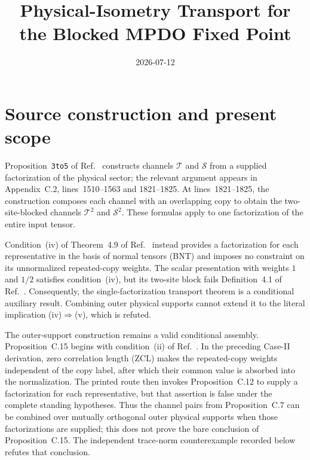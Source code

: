\documentclass{article}
\title{Physical-Isometry Transport for the Blocked MPDO Fixed Point}
\author{}
\date{2026-07-12}
\begin{document}
\maketitle
{}

\section{Source construction and present scope}

Proposition~\texttt{3to5} of Ref.~\cite{Cirac2016MPDO_arXiv} constructs
channels $\mathcal T$ and $\mathcal S$ from a supplied factorization of the
physical sector; the relevant argument appears in Appendix~C.2,
lines~1510--1563 and 1821--1825. At lines~1821--1825, the construction
composes each channel with an overlapping copy to obtain the two-site-blocked
channels $\mathcal T^2$ and $\mathcal S^2$. These formulas apply to one
factorization of the entire input tensor.

Condition~(iv) of Theorem~4.9 of Ref.~\cite{Cirac2016MPDO_arXiv} instead
provides a factorization for each representative in the basis of normal
tensors (BNT) and imposes no constraint on its unnormalized repeated-copy
weights. The scalar presentation with weights $1$ and $1/2$ satisfies
condition~(iv), but its two-site block fails Definition~4.1 of
Ref.~\cite{Cirac2016MPDO_arXiv}. Consequently, the single-factorization
transport theorem is a conditional auxiliary result. Combining outer physical
supports cannot extend it to the literal implication
(iv)$\Rightarrow$(v), which is refuted.

The outer-support construction remains a valid conditional assembly.
Proposition~C.15 begins with condition~(ii) of
Ref.~\cite{Cirac2016MPDO_arXiv}. In the preceding Case-II derivation, zero
correlation length (ZCL) makes the repeated-copy weights independent of the
copy label, after which their common value is absorbed into the normalization.
The printed route then invokes Proposition~C.12 to supply a
factorization for each representative, but that assertion is false under the
complete standing hypotheses. Thus the channel pairs from
Proposition~C.7 can be combined over mutually orthogonal outer
physical supports when those factorizations are supplied; this does not prove
the bare conclusion of Proposition~C.15. The independent trace-norm
counterexample recorded below refutes that conclusion.
\end{document}

